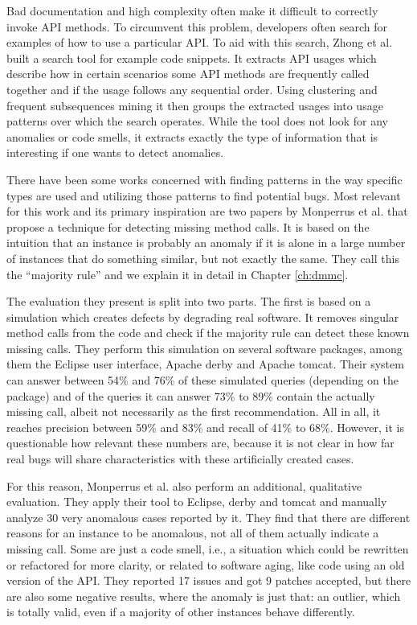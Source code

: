 Bad documentation and high complexity often make it difficult to correctly invoke API methods.
To circumvent this problem, developers often search for examples of how to use a particular API.
To aid with this search, Zhong et al. \cite{zhong2009mapo} built a search tool for example code snippets.
It extracts API usages which describe how in certain scenarios some API methods are frequently called together and if the usage follows any sequential order.
Using clustering and frequent subsequences mining it then groups the extracted usages into usage patterns over which the search operates.
While the tool does not look for any anomalies or code smells, it extracts exactly the type of information that is interesting if one wants to detect anomalies.

There have been some works concerned with finding patterns in the way specific types are used and utilizing those patterns to find potential bugs.
Most relevant for this work and its primary inspiration are two papers by Monperrus et al. \cite{monperrus2010detecting}\cite{monperrus2013detecting} that propose a technique for detecting missing method calls.
It is based on the intuition that an instance is probably an anomaly if it is alone in a large number of instances that do something similar, but not exactly the same.
They call this the ``majority rule'' and we explain it in detail in Chapter \ref{ch:dmmc}.

The evaluation they present is split into two parts.
The first is based on a simulation which creates defects by degrading real software.
It removes singular method calls from the code and check if the majority rule can detect these known missing calls.
They perform this simulation on several software packages, among them the Eclipse user interface, Apache derby and Apache tomcat.
Their system can answer between 54\% and 76\% of these simulated queries (depending on the package) and of the queries it can answer 73\% to 89\% contain the actually missing call, albeit not necessarily as the first recommendation.
All in all, it reaches precision between 59\% and 83\% and recall of 41\% to 68\%.
However, it is questionable how relevant these numbers are, because it is not clear in how far real bugs will share characteristics with these artificially created cases.

For this reason, Monperrus et al. also perform an additional, qualitative evaluation.
They apply their tool to Eclipse, derby and tomcat and manually analyze 30 very anomalous cases reported by it.
They find that there are different reasons for an instance to be anomalous, not all of them actually indicate a missing call.
Some are just a code smell, i.e., a situation which could be rewritten or refactored for more clarity, or related to software aging, like code using an old version of the API.
They reported 17 issues and got 9 patches accepted, but there are also some negative results, where the anomaly is just that: an outlier, which is totally valid, even if a majority of other instances behave differently.

